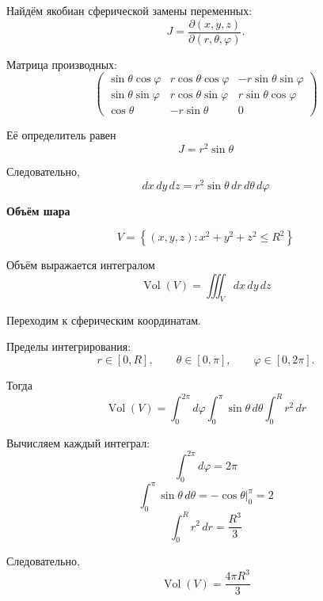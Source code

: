 \documentclass[12pt,a4paper]{article}
\begin{document}
Найдём якобиан сферической замены переменных:
\[
J=
\frac{\partial(x,y,z)}
{\partial(r,\theta,\varphi)}.
\]

Матрица производных:
\[
\begin{pmatrix}
\sin\theta\cos\varphi&
r\cos\theta\cos\varphi&
-r\sin\theta\sin\varphi\\
\sin\theta\sin\varphi&
r\cos\theta\sin\varphi&
r\sin\theta\cos\varphi\\
\cos\theta&
-r\sin\theta&
0
\end{pmatrix}
\]

Её определитель равен
\[
J=r^2\sin\theta
\]

Следовательно,
\[
dx\,dy\,dz
=r^2\sin\theta\,dr\,d\theta\,d\varphi
\]

\begin{example}
\textbf{Объём шара}

\[
V=\left\{(x,y,z):
x^2+y^2+z^2\leq R^2\right\}
\]

Объём выражается интегралом
\[
\operatorname{Vol}(V)=\iiint_V dx\,dy\,dz
\]

Переходим к сферическим координатам.

Пределы интегрирования:
\[
r\in[0,R],\qquad
\theta\in[0,\pi],\qquad
\varphi\in[0,2\pi].
\]

Тогда
\[
\operatorname{Vol}(V)=
\int_0^{2\pi}d\varphi
\int_0^\pi\sin\theta\,d\theta
\int_0^R r^2\,dr
\]

Вычисляем каждый интеграл:
\[
\int_0^{2\pi}d\varphi=2\pi
\]
\[
\int_0^\pi\sin\theta\,d\theta
=\left.-\cos\theta\right|_0^\pi=2
\]
\[
\int_0^R r^2\,dr=\frac{R^3}{3}
\]

Следовательно,
\[
\operatorname{Vol}(V)=\frac{4\pi R^3}{3}
\]
\end{example}
\end{document}
